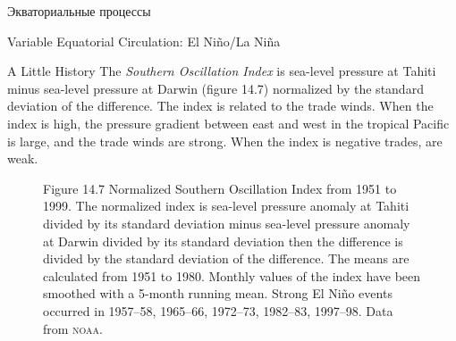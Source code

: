 \begin{chapter}{Экваториальные процессы}
\begin{section}{Variable Equatorial Circulation: El Ni\~{n}o/La Ni\~{n}a}
\begin{paragraph}{A Little History}
The \textit{Southern Oscillation Index} is sea-level pressure at Tahiti minus
sea-level pressure at Darwin (figure 14.7) normalized by the standard
deviation of the difference. The index is related to the trade
winds. When the index is high, the pressure gradient between east and
west in the tropical Pacific is large, and the trade winds are
strong. When the index is negative trades, are weak.
%

\begin{figure}[t!]
\caption{Figure 14.7 Normalized Southern Oscillation Index from 1951
to 1999. The normalized index is sea-level pressure anomaly at Tahiti
divided by its standard deviation minus sea-level pressure anomaly at
Darwin divided by its standard deviation then the difference is
divided by the standard deviation of the difference. The means are
calculated from 1951 to 1980. Monthly values of the index have been
smoothed with a 5-month running mean. Strong El Ni\~{n}o events
occurred in 1957--58, 1965--66, 1972--73, 1982--83, 1997--98. Data
from \textsc{noaa}.}
\label{fig:soi}
\end{figure}
%


\end{paragraph}
\end{section}
\end{chapter}
